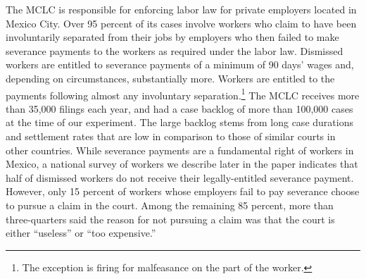 \documentclass[11pt, a4paper]{article}
\begin{document}
The MCLC is responsible for enforcing labor law for private employers located in Mexico City. Over 95 percent of its cases involve workers who claim to have been involuntarily separated from their jobs by employers who then failed to make severance payments to the workers as required under the labor law. Dismissed workers are entitled to severance payments of a minimum of 90 days' wages and, depending on circumstances, substantially more. %
Workers are entitled to the payments following almost any involuntary separation.{\footnote{The exception is firing for malfeasance on the part of the worker.}} The MCLC receives more than 35,000 filings each year, and had a case backlog of more than 100,000 cases at the time of our experiment. The large backlog stems from long case durations and settlement rates that are low in comparison to those of similar courts in other countries. While severance payments are a fundamental right of workers in Mexico, a national survey of workers we describe later in the paper indicates that half of dismissed workers do not receive their legally-entitled severance payment. However, only 15 percent of workers whose employers fail to pay severance choose to pursue a claim in the court. Among the remaining 85 percent, more than three-quarters said the reason for not pursuing a claim was that the court is either ``useless'' or ``too expensive.''  %
\end{document}
